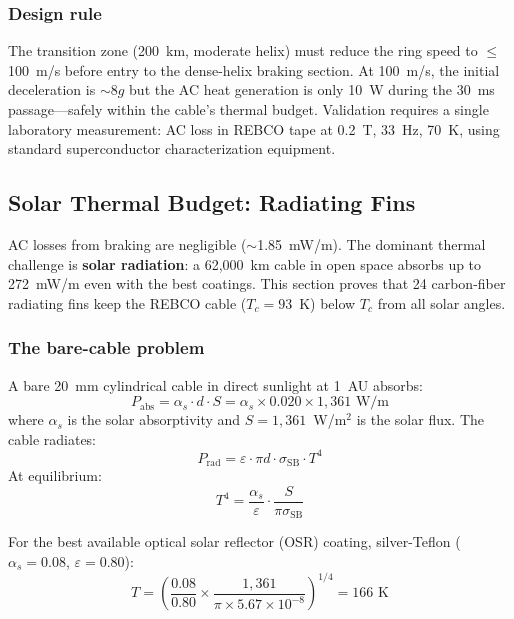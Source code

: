 \documentclass[12pt,letterpaper]{article}
\begin{document}
\subsubsection{Design rule}

The transition zone (200~km, moderate helix) must reduce the ring speed to $\leq$100~m/s before entry to the dense-helix braking section. At 100~m/s, the initial deceleration is $\sim$8$g$ but the AC heat generation is only 10~W during the 30~ms passage---safely within the cable's thermal budget. Validation requires a single laboratory measurement: AC loss in REBCO tape at 0.2~T, 33~Hz, 70~K, using standard superconductor characterization equipment.

\subsection{Solar Thermal Budget: Radiating Fins}\label{sec:solar_thermal}

AC losses from braking are negligible (${\sim}$1.85~mW/m). The dominant thermal challenge is \textbf{solar radiation}: a 62,000~km cable in open space absorbs up to 272~mW/m even with the best coatings. This section proves that 24 carbon-fiber radiating fins keep the REBCO cable ($T_c = 93$~K) below $T_c$ from all solar angles.

\subsubsection{The bare-cable problem}

A bare 20~mm cylindrical cable in direct sunlight at 1~AU absorbs:
\begin{equation}
P_{\text{abs}} = \alpha_s \cdot d \cdot S = \alpha_s \times 0.020 \times 1{,}361 \text{~W/m}
\end{equation}
where $\alpha_s$ is the solar absorptivity and $S = 1{,}361$~W/m$^2$ is the solar flux. The cable radiates:
\begin{equation}
P_{\text{rad}} = \varepsilon \cdot \pi d \cdot \sigma_{\text{SB}} \cdot T^4
\end{equation}
At equilibrium:
\begin{equation}
T^4 = \frac{\alpha_s}{\varepsilon} \cdot \frac{S}{\pi \sigma_{\text{SB}}}
\end{equation}

For the best available optical solar reflector (OSR) coating, silver-Teflon ($\alpha_s = 0.08$, $\varepsilon = 0.80$):
\[
T = \left(\frac{0.08}{0.80} \times \frac{1{,}361}{\pi \times 5.67 \times 10^{-8}}\right)^{1/4} = 166 \text{~K}
\]
\end{document}
